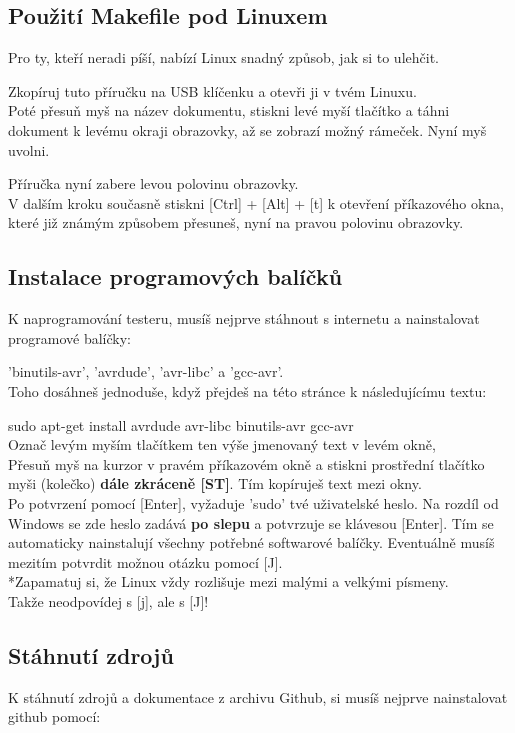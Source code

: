 \subsection{Použití Makefile pod Linuxem}
\vspace*{-0.2cm}
Pro ty, kteří neradi píší, nabízí Linux snadný způsob, jak si to ulehčit.\

Zkopíruj tuto příručku na USB klíčenku a otevři ji v tvém Linuxu. \\
Poté přesuň myš na název dokumentu, stiskni levé myší tlačítko a táhni dokument k levému okraji obrazovky, až se zobrazí možný rámeček. Nyní  myš uvolni.

Příručka nyní zabere levou polovinu obrazovky.\\
V dalším kroku současně stiskni [Ctrl] + [Alt] + [t] k otevření příkazového okna, které již známým 
způsobem přesuneš, nyní na pravou polovinu obrazovky.
\vspace*{-0.4cm}
\subsection{Instalace programových balíčků}
\vspace*{-0.2cm}
K naprogramování testeru, musíš nejprve stáhnout s internetu a nainstalovat programové balíčky:

 'binutils-avr', 'avrdude', 'avr-libc' a 'gcc-avr'.\\
Toho dosáhneš jednoduše, když přejdeš na této stránce k následujícímu textu:

sudo apt-get install avrdude avr-libc binutils-avr gcc-avr
\\Označ levým myším tlačítkem ten výše jmenovaný text v levém okně,
\\ Přesuň myš na kurzor v pravém příkazovém okně a stiskni prostřední tlačítko myši (kolečko) \textbf{dále zkráceně [ST]}. Tím kopíruješ text mezi okny.\\
Po potvrzení pomocí [Enter], vyžaduje 'sudo' tvé uživatelské heslo. Na rozdíl od Windows se zde heslo zadává \textbf{po slepu} a potvrzuje se klávesou [Enter].
Tím se automaticky nainstalují všechny potřebné softwarové balíčky.
Eventuálně musíš  mezitím potvrdit možnou otázku pomocí [J].
\\*Zapamatuj si, že Linux vždy rozlišuje mezi malými a velkými písmeny.
\\ Takže neodpovídej s [j], ale s [J]!
\subsection{Stáhnutí zdrojů}
\vspace*{-0.3cm}
K stáhnutí zdrojů a dokumentace z archivu Github, si musíš nejprve nainstalovat github pomocí:

